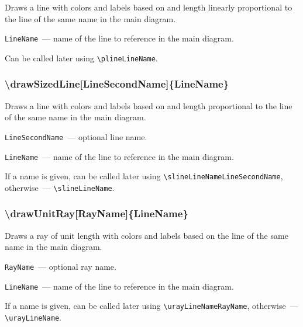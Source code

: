 	Draws a line with colors and labels based on and length linearly proportional to the line of the same name in the main diagram.

	\texttt{LineName}~— name of the line to reference in the main diagram. 
	
	Can be called later using \texttt{\textbackslash plineLineName}.


\subsubsection{\textbackslash drawSizedLine[LineSecondName]\{LineName\}}

	Draws a line with colors and labels based on and length proportional to the line of the same name in the main diagram.

	\texttt{LineSecondName}~— optional line name. 
	
	\texttt{LineName}~— name of the line to reference in the main diagram. 
	
	If a name is given, can be called later using \texttt{\textbackslash slineLineNameLineSecondName}, otherwise~— \texttt{\textbackslash slineLineName}. 

\subsubsection{\textbackslash drawUnitRay[RayName]\{LineName\}}

	Draws a ray of unit length with colors and labels based on the line of the same name in the main diagram.

	\texttt{RayName}~— optional ray name.
	
	\texttt{LineName}~— name of the line to reference in the main diagram. 

	If a name is given, can be called later using \texttt{\textbackslash urayLineNameRayName}, otherwise~— \texttt{\textbackslash urayLineName}. 



	

